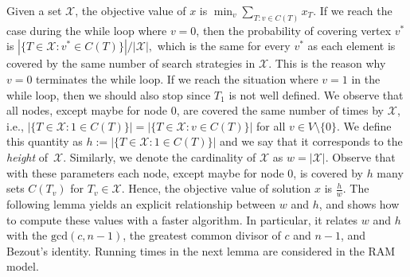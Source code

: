 \documentclass[11pt]{article}
\newcommand{\X}{\mathcal{X}}
\newcommand\+{\mkern2mu}
\newcommand{\T}{T}
\begin{document}
Given a set $\mathcal{X}$, the objective value of $x$ is $\min_v \sum_{T: v\in C(T)} x_T$. If we reach the case during the while loop where $v=0$, then the probability of covering vertex $v^*$ is $
|\{\T\in \mathcal{X}: v^*\in C(\T) \}|/|\mathcal{X}|,
$ 
which is the same for every $v^*$ as each element is covered by the same number of search strategies in $\mathcal{X}$. This is the reason why $v=0$ terminates the while loop. If we reach the situation where $v=1$ in the while loop, then we should also stop since $\T_1$ is not well defined. We observe that all nodes, except maybe for node $0$, are covered the same number of times by $\mathcal{X}$, i.e., $|\{\T\in\mathcal{X}: 1\in C(\T) \}|=|\{\T\in \mathcal{X}: v\in C(\T) \}|$ for all $v\in V\setminus\{0\}$. We define this quantity as $h:= |\{\T\in\mathcal{X}: 1\in C(\T) \}|$ and we say that it corresponds to the \textit{height} of~$\mathcal{X}$. Similarly, we denote the cardinality of $\mathcal{X}$ as $w=|\mathcal{X}|$. Observe that with these parameters each node, except maybe for node $0$, is covered by $h$ many sets $C(T_v)$ for $\T_v\in \X$. Hence, the objective value of solution $x$ is $\frac{h}{w}$. The following lemma yields an explicit relationship between $w$ and $h$, and shows how to compute these values with a faster algorithm. In particular, it relates $w$ and $h$ with the $\text{gcd}(c,n-1)$, the greatest common divisor of $c$ and $n-1$, and Bezout's identity. Running times in the next lemma are considered in the RAM model.
\end{document}
